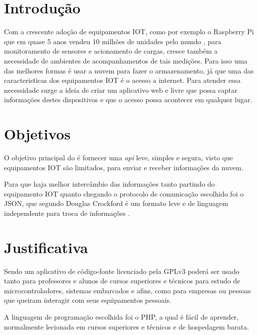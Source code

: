 \section{Introdução}\label{introduuxe7uxe3o}

Com a crescente adoção de equipamentos IOT, como por exemplo o Raspberry
Pi que em quase 5 anos vendeu 10 milhões de unidades pelo mundo
\cite{raspberry-pi-blog:2016}, para monitoramento de sensores e
acionamento de cargas, cresce também a necessidade de ambientes de
acompanhamentos de tais medições. Para isso uma das melhores formas é
usar a nuvem para fazer o armazenamento, já que uma das caracteristicas
dos equipamentos IOT é o acesso a internet. Para atender essa
necessidade surge a ideia de criar um aplicativo web e livre que possa
captar informações destes dispositivos e que o acesso possa acontecer em
qualquer lugar.

\section{Objetivos}\label{objetivos}

O objetivo principal do \wm é fornecer uma \emph{api} leve, simples e
segura, visto que equipamentos IOT são limitados, para enviar e receber
informações da nuvem.

Para que haja melhor intercâmbio das informações tanto partindo do
equipamento IOT quanto chegando o protocolo de comunicação escolhido foi
o JSON, que segundo Douglas Crockford é um formato leve e de linguagem
independente para troca de informações \cite{crockford-2015}.

\section{Justificativa}\label{justificativa}

Sendo um aplicativo de código-fonte licenciado pela GPLv3 poderá ser
usado tanto para professores e alunos de cursos superiores e técnicos
para estudo de microcontroladores, sistemas embarcados e afins, como
para empresas ou pessoas que queiram interagir com seus equipamentos
pessoais.

A linguagem de programação escolhida foi o PHP, a qual é fácil de
aprender, normalmente lecionada em cursos superiores e técnicos e de
hospedagem barata.

